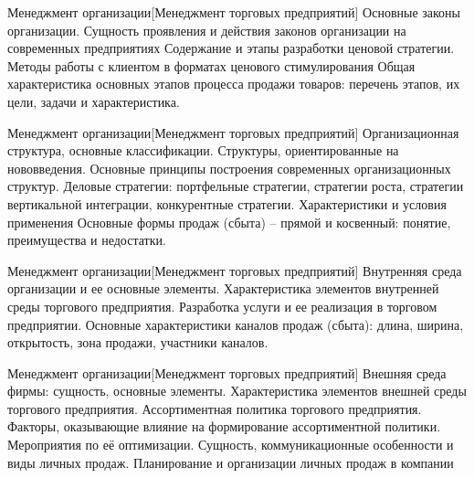 \documentclass[
	11pt,
	a4paper,
	]
	{article}
\begin{document}
\vfill



\begin{minipage}[t][\miniH]{\miniL}\centering
	 {Менеджмент организации}[Менеджмент торговых предприятий]
		{
			Основные законы организации. Сущность проявления и действия законов организации на современных предприятиях
		}{
			Содержание и этапы разработки ценовой стратегии. Методы работы с клиентом в форматах ценового стимулирования
		}{
			Общая характеристика основных этапов процесса продажи товаров: перечень этапов, их цели, задачи и характеристика.
		}
	\lowGE
\end{minipage}

\vfill



\begin{minipage}[t][\miniH]{\miniL}\centering
	 {Менеджмент организации}[Менеджмент торговых предприятий]
		{
			Организационная структура, основные классификации. Структуры, ориентированные на нововведения. Основные принципы построения современных организационных структур.
		}{
			Деловые стратегии: портфельные стратегии, стратегии роста, стратегии вертикальной интеграции, конкурентные стратегии. Характеристики и условия применения
		}{
			Основные формы продаж (сбыта) – прямой и косвенный: понятие, преимущества и недостатки.
		}
	\lowGE
\end{minipage}





\begin{minipage}[t][\miniH]{\miniL}\centering
	 {Менеджмент организации}[Менеджмент торговых предприятий]
		{
			Внутренняя среда организации и ее основные элементы. Характеристика элементов внутренней среды торгового предприятия.
		}{
			Разработка услуги и ее реализация в торговом предприятии.
		}{
			Основные характеристики каналов продаж (сбыта): длина, ширина, открытость, зона продажи, участники каналов.
		}
	\lowGE
\end{minipage}

\vfill



\begin{minipage}[t][\miniH]{\miniL}\centering
	 {Менеджмент организации}[Менеджмент торговых предприятий]
		{
			Внешняя среда фирмы: сущность, основные элементы. Характеристика элементов внешней среды торгового предприятия.
		}{
			Ассортиментная политика торгового предприятия. Факторы, оказывающие влияние на формирование ассортиментной политики. Мероприятия по её оптимизации.
		}{
			Сущность, коммуникационные особенности и виды личных продаж. Планирование и организации личных продаж в компании
		}
	\lowGE
\end{minipage}
\end{document}
